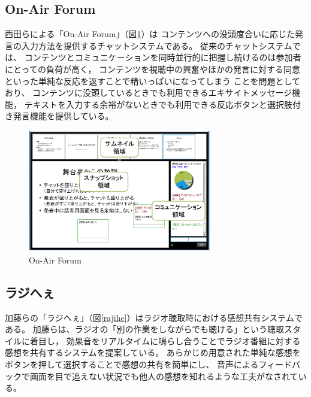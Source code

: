 \subsection{On-Air Forum}

西田らによる「On-Air Forum\cite{nishida2011}」（図\ref{onairforum}）は
コンテンツへの没頭度合いに応じた発言の入力方法を提供するチャットシステムである。
従来のチャットシステムでは、
コンテンツとコミュニケーションを同時並行的に把握し続けるのは参加者にとっての負荷が高く，
コンテンツを視聴中の興奮やほかの発言に対する同意といった単純な反応を返すことで精いっぱいになってしまう
ことを問題としており、
コンテンツに没頭しているときでも利用できるエキサイトメッセージ機能，
テキストを入力する余裕がないときでも利用できる反応ボタンと選択肢付き発言機能を提供している。

\begin{figure}[H]
\centering
\includegraphics[width=8cm]{images/onairforum.png}
\caption{On-Air Forum}
\label{onairforum}
\end{figure}


\subsection{ラジへぇ}

加藤らの「ラジへぇ\cite{110009657336}」（図\ref{rajihe}）はラジオ聴取時における感想共有システムである。
加藤らは、ラジオの「別の作業をしながらでも聴ける」という聴取スタイルに着目し，
効果音をリアルタイムに鳴らし合うことでラジオ番組に対する感想を共有するシステムを提案している。
あらかじめ用意された単純な感想をボタンを押して選択することで感想の共有を簡単にし、
音声によるフィードバックで画面を目で追えない状況でも他人の感想を知れるような工夫がなされている。

